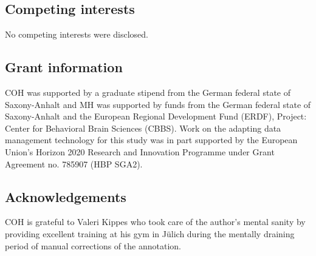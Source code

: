\documentclass[10pt,a4paper,onecolumn]{article}
\begin{document}
\subsection*{Competing interests}
No competing interests were disclosed.

\subsection*{Grant information}
COH was supported by a graduate stipend from the German federal state of
Saxony-Anhalt and MH was supported by funds from the German federal state of
Saxony-Anhalt and the European Regional Development Fund (ERDF), Project:
Center for Behavioral Brain Sciences (CBBS). Work on the adapting data
management technology for this study was in part supported by the European
Union's Horizon 2020 Research and Innovation Programme under Grant Agreement
no. 785907 (HBP SGA2).


\subsection*{Acknowledgements}
COH is grateful to Valeri Kippes who took care of the author's mental sanity by providing excellent training at his gym in Jülich during the mentally draining period of manual corrections of the annotation.

{\small
}
\end{document}
